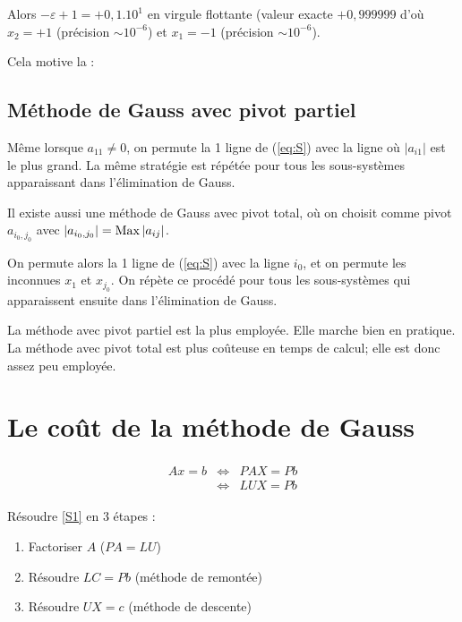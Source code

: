 Alors $-\varepsilon + 1 = +0,1.10^1$ en virgule flottante (valeur exacte
$+0,999999$ d'où $x_2 = +1$ (précision $\sim 10^{-6}$) et $x_1 = -1$ (précision
$\sim 10^{-6}$).

Cela motive la :

\subsection*{Méthode de Gauss avec pivot partiel}
Même lorsque $a_{11} \ne 0$, on permute la 1 ligne de (\ref{eq:S}) avec la
ligne où $|a_{i1}|$ est le plus grand. La même stratégie est répétée pour tous les
sous-systèmes apparaissant dans l'élimination de Gauss.

\begin{remark}
    Il existe aussi une méthode de Gauss avec pivot total, où on choisit comme
    pivot $a_{i_0,j_0}$ avec $|a_{i_0,j_0}| = \operatorname{Max} |a_{ij}|$.

    On permute alors la 1 ligne de (\ref{eq:S}) avec la ligne $i_0$, et on
    permute les inconnues $x_1$ et $x_{j_0}$. On répète ce procédé pour tous
    les sous-systèmes qui apparaissent ensuite dans l'élimination de Gauss.

    La méthode avec pivot partiel est la plus employée. Elle marche bien en pratique.
    La méthode avec pivot total est plus coûteuse en temps de calcul; elle est donc
    assez peu employée.
\end{remark}


\section{Le coût de la méthode de Gauss}

\begin{eqnarray}
    \begin{split}
        Ax = b & \Leftrightarrow & PAX = Pb \\
        & \Leftrightarrow & LUX = Pb
    \end{split}
    \label{S1}
\end{eqnarray}

Résoudre \ref{S1} en 3 étapes :
\begin{enumerate}
    \item Factoriser $A$ ($PA = LU$)
    \item Résoudre $LC = Pb$ (méthode de remontée)
    \item Résoudre $UX = c$ (méthode de descente)
\end{enumerate}

